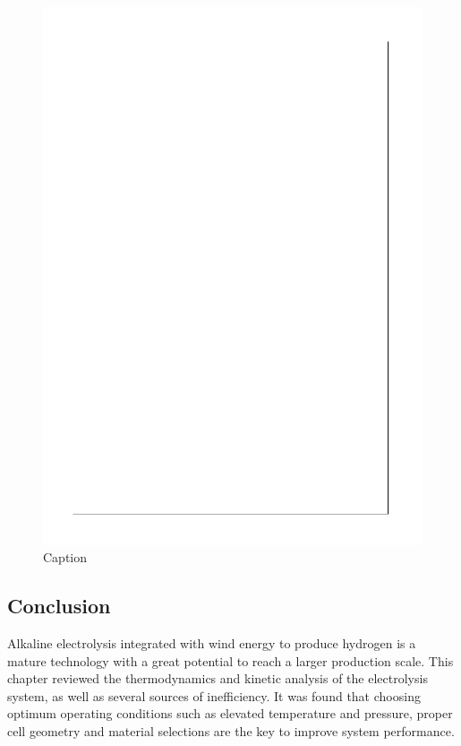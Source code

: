 \begin{figure}
    \centering
    \includegraphics{electrolysis/hazop.pdf}
    \caption{Caption}
    \label{fig:my_label}
\end{figure}



\subsection{Conclusion} 
Alkaline electrolysis integrated with wind energy to produce hydrogen is a mature technology with a great potential to reach a larger production scale. 
This chapter reviewed the thermodynamics and kinetic analysis of the electrolysis system, as well as several sources of inefficiency. It was found that choosing optimum operating conditions such as elevated temperature and pressure, proper cell geometry and material selections are the key to improve system performance. 

